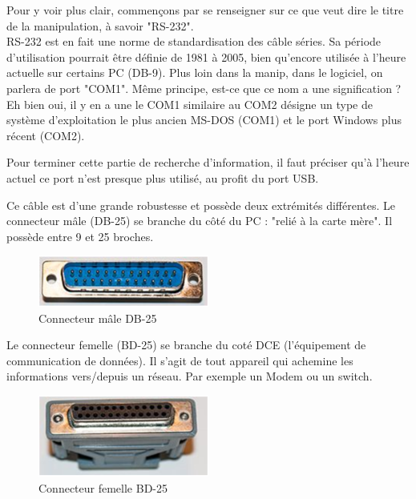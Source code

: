 \documentclass[a4paper]{article}
\begin{document}
Pour y voir plus clair, commençons par se renseigner sur ce que veut dire le titre de la manipulation, à savoir "RS-232". \\
RS-232 est en fait une norme de standardisation des câble séries. Sa période d’utilisation pourrait être définie de 1981 à 2005, bien qu’encore utilisée à l’heure actuelle sur certains PC (DB-9). Plus loin dans la manip, dans le logiciel, on parlera de port "COM1". Même principe, est-ce que ce nom a une signification ? Eh bien oui, il y en a une le COM1 similaire au COM2 désigne un type de système d’exploitation le plus ancien MS-DOS (COM1) et le port Windows plus récent (COM2).

Pour terminer cette partie de recherche d’information, il faut préciser qu’à l’heure actuel ce port n’est presque plus utilisé, au profit du port USB.





Ce câble est d’une grande robustesse et possède deux extrémités différentes. Le connecteur mâle (DB-25) se branche du côté du PC : "relié à la carte mère". Il possède entre 9 et 25 broches.

\begin{figure}[H]
    \centering
    \includegraphics[width=0.5\textwidth]{images/ConnecteurMaleDB25.PNG}
    \caption{Connecteur mâle DB-25}
    \label{fig:ConnecteurMaleDB25}
\end{figure}

Le connecteur femelle (BD-25) se branche du coté DCE (l’équipement de communication de données). Il s’agit de tout appareil qui achemine les informations vers/depuis un réseau. Par exemple un Modem ou un switch.

\begin{figure}[H]
    \centering
    \includegraphics[width=0.5\textwidth]{images/ConnecteurFemelleBD25.PNG}
    \caption{Connecteur femelle BD-25}
    \label{fig:ConnecteurFemelleBD25}
\end{figure}
\end{document}
